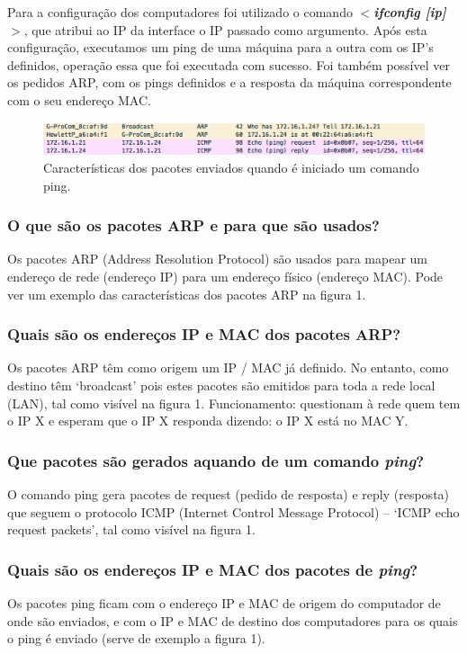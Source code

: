 \documentclass[a4paper, 11pt]{article}
\begin{document}
Para a configuração dos computadores foi utilizado o comando \textbf{\textit{$<$ifconfig [ip]$>$}}, que atribui ao IP da interface o IP passado como argumento. Após esta configuração, executamos um ping de uma máquina para a outra com os IP’s definidos, operação essa que foi executada com sucesso. Foi também possível ver os pedidos ARP, com os pings definidos e a resposta da máquina correspondente com o seu endereço MAC.

\begin{figure}[h]
\centering
\includegraphics[scale=0.5]{images/Exp1_arp+ping.png}
\caption{Características dos pacotes enviados quando é iniciado um comando ping.}
\label{Momentanpol}
\end{figure}

\subsubsection{O que são os pacotes ARP e para que são usados?}
Os pacotes ARP (Address Resolution Protocol) são usados para mapear um endereço de rede (endereço IP) para um endereço físico (endereço MAC). Pode ver um exemplo das características dos pacotes ARP na figura 1.

\subsubsection{Quais são os endereços IP e MAC dos pacotes ARP?}
Os pacotes ARP têm como origem um IP / MAC já definido. No entanto, como destino têm ‘broadcast’ pois estes pacotes são emitidos para toda a rede local (LAN), tal como visível na figura 1.
Funcionamento: questionam à rede quem tem o IP X e esperam que o IP X responda dizendo:  o IP X está no MAC Y.

\subsubsection{Que pacotes são gerados aquando de um comando \textit{ping}?}
O comando ping gera pacotes de request (pedido de resposta) e reply (resposta) que seguem o protocolo ICMP (Internet Control Message Protocol) – ‘ICMP echo request packets’, tal como visível na figura 1.

\subsubsection{Quais são os endereços IP e MAC dos pacotes de \textit{ping}?}
Os pacotes ping ficam com o endereço IP e MAC de origem do computador de onde são enviados, e com o IP e MAC de destino dos computadores para os quais o ping é enviado (serve de exemplo a figura 1).
\end{document}
